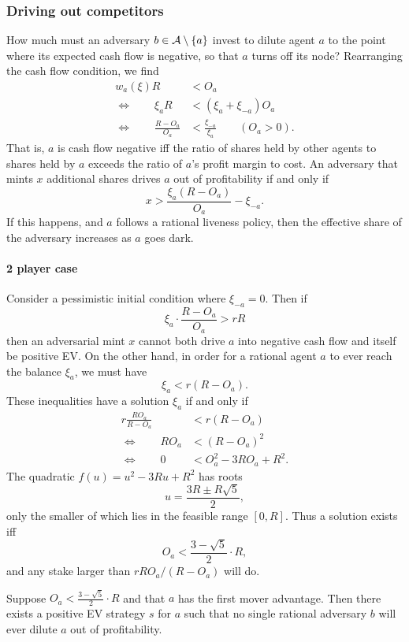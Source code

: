 \subsubsection{Driving out competitors}

How much must an adversary $b\in\mathcal{A}\setminus\{a\}$ invest to dilute agent $a$ to the point where its expected cash flow is negative, so that $a$ turns off its node?
%
Rearranging the cash flow condition, we find
\begin{align*}
  w_a(\xi) R &< O_a \\
  \Leftrightarrow \qquad \xi_a R &< (\xi_a+\xi_{-a})O_a \\
  \Leftrightarrow \qquad \frac { R-O_a } {O_a} &< \frac{\xi_{-a}}{\xi_a} \qquad (O_a>0).
\end{align*}
That is, $a$ is cash flow negative iff the ratio of shares held by other agents to shares held by $a$ exceeds the ratio of $a$'s profit margin to cost.
%
An adversary that mints $x$ additional shares drives $a$ out of profitability if and only if
\[
  x > \frac { \xi_a(R-O_a) } {O_a} - \xi_{-a}.
\]
If this happens, and $a$ follows a rational liveness policy, then the effective share of the adversary increases as $a$ goes dark.

\paragraph{2 player case}
Consider a pessimistic initial condition where $\xi_{-a}=0$.
%
Then if
\[
  \xi_a\cdot\frac{R-O_a}{O_a} > rR
\]
then an adversarial mint $x$ cannot both drive $a$ into negative cash flow and itself be positive EV.
%
On the other hand, in order for a rational agent $a$ to ever reach the balance $\xi_a$, we must have
\[
  \xi_a< r(R-O_a).
\]
These inequalities have a solution $\xi_a$ if and only if
\begin{align*}
  r\frac{RO_a} {R-O_a} &< r(R-O_a) \\
  \Leftrightarrow \qquad RO_a &< (R-O_a)^2  \\
  \Leftrightarrow \qquad 0 &< O_a^2 - 3RO_a + R^2.
\end{align*}
The quadratic $f(u) = u^2 - 3Ru + R^2$ has roots
\[
  u = \frac{3R \pm R\sqrt{5}} {2},
\]
only the smaller of which lies in the feasible range $[0,R]$.
%
Thus a solution exists iff
\[
  O_a < \frac{3-\sqrt {5}}{2} \cdot R,
\]
and any stake larger than $rRO_a/(R-O_a)$ will do.

\begin{proposition*}
  
  Suppose $O_a< \frac{3-\sqrt {5}}{2} \cdot R$ and that $a$ has the first mover advantage.
  Then there exists a positive EV strategy $s$ for $a$ such that no single rational adversary $b$ will ever dilute $a$ out of profitability.

\end{proposition*}

